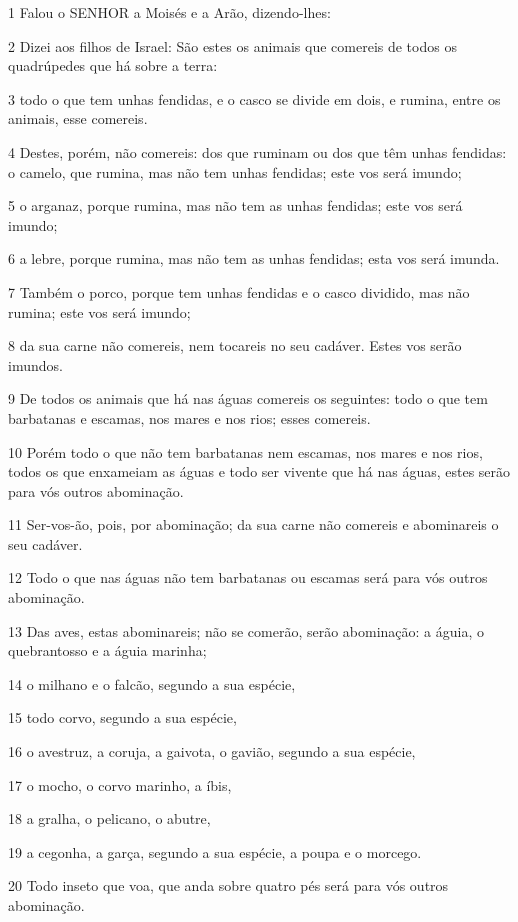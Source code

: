 \par 1 Falou o SENHOR a Moisés e a Arão, dizendo-lhes:
\par 2 Dizei aos filhos de Israel: São estes os animais que comereis de todos os quadrúpedes que há sobre a terra:
\par 3 todo o que tem unhas fendidas, e o casco se divide em dois, e rumina, entre os animais, esse comereis.
\par 4 Destes, porém, não comereis: dos que ruminam ou dos que têm unhas fendidas: o camelo, que rumina, mas não tem unhas fendidas; este vos será imundo;
\par 5 o arganaz, porque rumina, mas não tem as unhas fendidas; este vos será imundo;
\par 6 a lebre, porque rumina, mas não tem as unhas fendidas; esta vos será imunda.
\par 7 Também o porco, porque tem unhas fendidas e o casco dividido, mas não rumina; este vos será imundo;
\par 8 da sua carne não comereis, nem tocareis no seu cadáver. Estes vos serão imundos.
\par 9 De todos os animais que há nas águas comereis os seguintes: todo o que tem barbatanas e escamas, nos mares e nos rios; esses comereis.
\par 10 Porém todo o que não tem barbatanas nem escamas, nos mares e nos rios, todos os que enxameiam as águas e todo ser vivente que há nas águas, estes serão para vós outros abominação.
\par 11 Ser-vos-ão, pois, por abominação; da sua carne não comereis e abominareis o seu cadáver.
\par 12 Todo o que nas águas não tem barbatanas ou escamas será para vós outros abominação.
\par 13 Das aves, estas abominareis; não se comerão, serão abominação: a águia, o quebrantosso e a águia marinha;
\par 14 o milhano e o falcão, segundo a sua espécie,
\par 15 todo corvo, segundo a sua espécie,
\par 16 o avestruz, a coruja, a gaivota, o gavião, segundo a sua espécie,
\par 17 o mocho, o corvo marinho, a íbis,
\par 18 a gralha, o pelicano, o abutre,
\par 19 a cegonha, a garça, segundo a sua espécie, a poupa e o morcego.
\par 20 Todo inseto que voa, que anda sobre quatro pés será para vós outros abominação.
